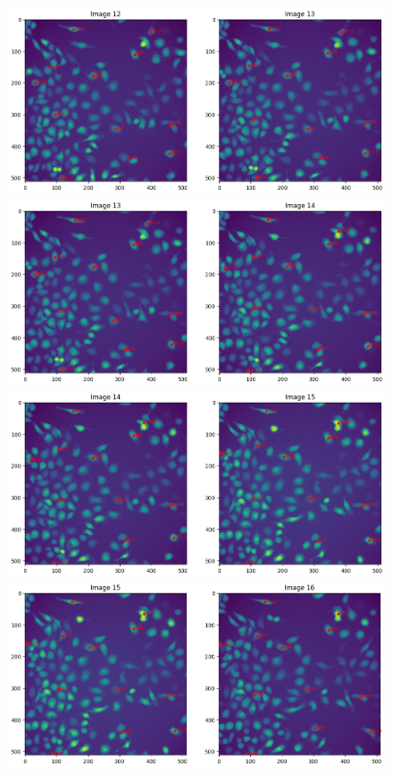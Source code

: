\documentclass{article}
\begin{document}
\begin{figure}[h!]
\centering
\includegraphics[width=0.75\linewidth]{Report/RImages/Traces_Control/image_13a.png}
\includegraphics[width=0.75\linewidth]{Report/RImages/Traces_Control/image_14a.png}
\includegraphics[width=0.75\linewidth]{Report/RImages/Traces_Control/image_15a.png}
\includegraphics[width=0.75\linewidth]{Report/RImages/Traces_Control/image_16a.png}
\end{figure}

\clearpage
\end{document}
